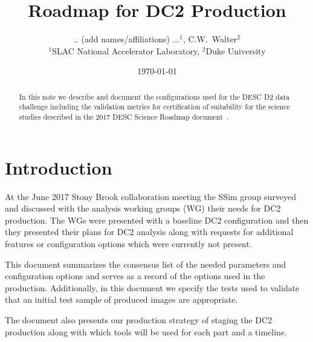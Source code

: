 \documentclass[12pt,letterpaper]{article}
\begin{document}

\title{Roadmap for DC2 Production}
\author{ .. (add names/affiliations) ...$^1$, C.W.~Walter$^2$ \\
{\small $^1$SLAC National Accelerator Laboratory, $^2$Duke University}}

\date{\today}

\maketitle

\begin{abstract}
  In this note we describe and document the configurations used for
  the DESC D2 data challenge including the validation metrics for
  certification of suitability for the science studies described in
  the 2017 DESC Science Roadmap document~\cite{SRM:2015}.
\end{abstract}

\noindent
\begin{center}
  \fboxsep=5pt  
  \end{center} 
\vspace{0.1in}

\section{Introduction}

At the June 2017 Stony Brook collaboration meeting the SSim group
surveyed and discussed with the analysis working groups (WG) their
needs for DC2 production.  The WGs were presented with a baseline DC2
configuration and then they presented their plans for DC2 analysis
along with requests for additional features or configuration options
which were currently not present.

This document summarizes the consensus list of the needed parameters
and configuration options and serves as a record of the options used
in the production.  Additionally, in this document we specify the
tests used to validate that an initial test sample of produced images
are appropriate.

The document also presents our production strategy of staging the DC2
production along with which tools will be used for each part and a timeline.
 
\end{document}
